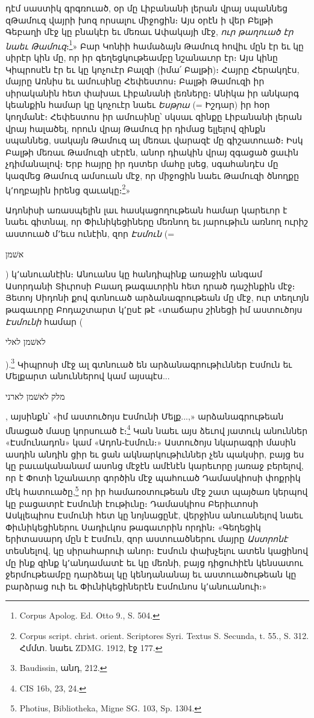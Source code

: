\documentclass{article}
\begin{document}
{դէմ սաստիկ գրգռուած, օր մը Լիբանանի լերան վրայ սպաննեց զԹամուզ վայրի խոզ որսալու միջոցին։ Այս օրէն ի վեր Բելթի Գեբաղի մէջ կը բնակէր եւ մեռաւ Ափակայի մէջ, \emph{ուր թաղուած էր նաեւ Թամուզ}։\footnote{Corpus Apolog. Ed. Otto 9., S. 504.}» Բար Կոնիի համաձայն Թամուզ հովիւ մըն էր եւ կը սիրէր կին մը, որ իր գեղեցկութեամբը նշանաւոր էր։ Այս կինը Կիպրոսէն էր եւ կը կոչուէր Բալզի (իմա՛ Բալթի)։ Հայրը Հերակղէս, մայրը Առնիս եւ ամուսինը Հեփեստոս։ Բալթի Թամուզի իր սիրականին հետ փախաւ Լիբանանի լեռները։ Անիկա իր անկարգ կեանքին համար կը կոչուէր նաեւ \emph{Եսթրա} (= Իշդար) իր հօր կողմանէ։ Հեփեստոս իր ամուսինը՝ սկսաւ զինքը Լիբանանի լերան վրայ հալածել, որուն վրայ Թամուզ իր դիմաց ելլելով զինքն սպաննեց, սակայն Թամուզ ալ մեռաւ վարազէ մը գիշատուած։ Իսկ Բալթի մեռաւ Թամուզի սէրէն, անոր դիակին վրայ զգացած ցաւին չդիմանալով։ Երբ հայրը իր դստեր մահը լսեց, սգահանդէս մը կազմեց Թամուզ ամսուան մէջ, որ միջոցին նաեւ Թամուզի ծնողքը կ՚ողբային իրենց զաւակը։\footnote{Corpus script. christ. orient. Scriptores Syri. Textus S. Secunda, t. 55., S. 312. Հմմտ. նաեւ ZDMG. 1912, էջ 177.}»

Ադոնիսի առասպելին լաւ հասկացողութեան համար կարեւոր է նաեւ գիտնալ, որ Փիւնիկեցիները մեռնող եւ յարութիւն առնող ուրիշ աստուած մ՚եւս ունէին, զոր \emph{Էսմուն} (= \begin{hebrewfont}אשׁמן\end{hebrewfont}) կ՚անուանէին։ Անուանս կը հանդիպինք առաջին անգամ Ասորդանի Տիւրոսի Բաաղ թագաւորին հետ դրած դաշինքին մէջ։ Յետոյ Սիդոնի քով գտնուած արձանագրութեան մը մէջ, ուր տեղւոյն թագաւորը Բոդաշտարտ կ՚ըսէ թէ «տաճարս շինեցի իմ աստուծոյս \emph{Էսմունի} համար (\begin{hebrewfont}לאשׁמן לאלי\end{hebrewfont}).\footnote{Baudissin, անդ, 212.} Կիպրոսի մէջ ալ գտնուած են արձանագրութիւններ Էսմուն եւ Մելքարտ անուններով կամ այսպէս... \begin{hebrewfont}מלק לאשׁמן לארני\end{hebrewfont}, այսինքն՝ «իմ աստուծոյս Էսմունի Մելք...,» արձանագրութեան մնացած մասը կորսուած է։\footnote{CIS 16b, 23, 24.} Կան նաեւ այս ձեւով յատուկ անուններ «Էսմունադոն» կամ «Ադոն֊էսմուն։» Աստուծոյս նկարագրի մասին ասդին անդին ցիր եւ ցան ակնարկութիւններ չեն պակսիր, բայց ես կը բաւականանամ ասոնց մէջէն ամէնէն կարեւորը յառաջ բերելով, որ է Փոտի նշանաւոր գործին մէջ պահուած Դամասկիոսի փոքրիկ մէկ հատուածը,\footnote{Photius, Bibliotheka, Migne SG. 103, Sp. 1304.} որ իր համառօտութեան մէջ շատ պայծառ կերպով կը բացատրէ Էսմունի էութիւնը։ Դամասկիոս Բերիւտոսի Ասկլեպիոս Էսմունի հետ կը նոյնացընէ, վերջինս անուանելով նաեւ Փիւնիկեցիներու Սադիւկոս թագաւորին որդին։ «Գեղեցիկ երիտասարդ մըն է Էսմուն, զոր աստուածներու մայրը \emph{Աստրոնէ} տեսնելով, կը սիրահարուի անոր։ Էսմուն փախչելու ատեն կացինով մը ինք զինք կ՚անդամատէ եւ կը մեռնի, բայց դիցուհիէն կենսատու ջերմութեամբը դարձեալ կը կենդանանայ եւ աստուածութեան կը բարձրաց ուի եւ Փիւնիկեցիներէն Էսմունոս կ՚անուանուի։»

}
\end{document}
